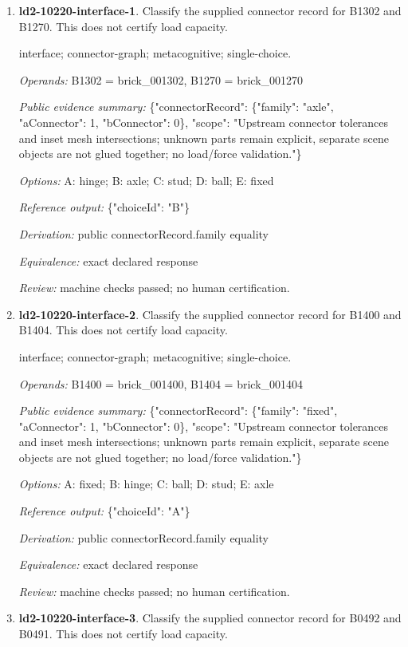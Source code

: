\begin{enumerate}
\item \textbf{ld2-10220-interface-1}. Classify the supplied connector record for B1302 and B1270. This does not certify load capacity.
\par{\small interface; connector-graph; metacognitive; single-choice.\par\textit{Operands:} B1302 = brick\_001302, B1270 = brick\_001270\par\textit{Public evidence summary:} \{"connectorRecord": \{"family": "axle", "aConnector": 1, "bConnector": 0\}, "scope": "Upstream connector tolerances and inset mesh intersections; unknown parts remain explicit, separate scene objects are not glued together; no load/force validation."\}\par\textit{Options:} A: hinge; B: axle; C: stud; D: ball; E: fixed\par\textit{Reference output:} \{"choiceId": "B"\}\par\textit{Derivation:} public connectorRecord.family equality\par\textit{Equivalence:} exact declared response\par\textit{Review:} machine checks passed; no human certification.}
\item \textbf{ld2-10220-interface-2}. Classify the supplied connector record for B1400 and B1404. This does not certify load capacity.
\par{\small interface; connector-graph; metacognitive; single-choice.\par\textit{Operands:} B1400 = brick\_001400, B1404 = brick\_001404\par\textit{Public evidence summary:} \{"connectorRecord": \{"family": "fixed", "aConnector": 1, "bConnector": 0\}, "scope": "Upstream connector tolerances and inset mesh intersections; unknown parts remain explicit, separate scene objects are not glued together; no load/force validation."\}\par\textit{Options:} A: fixed; B: hinge; C: ball; D: stud; E: axle\par\textit{Reference output:} \{"choiceId": "A"\}\par\textit{Derivation:} public connectorRecord.family equality\par\textit{Equivalence:} exact declared response\par\textit{Review:} machine checks passed; no human certification.}
\item \textbf{ld2-10220-interface-3}. Classify the supplied connector record for B0492 and B0491. This does not certify load capacity.

\end{enumerate}

